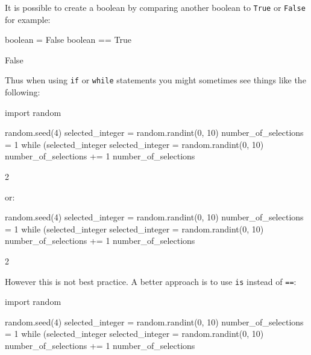 It is possible to create a boolean by comparing another boolean to \texttt{True} or
\texttt{False} for example:




\begin{pyin}
boolean = False
boolean == True
\end{pyin}





\begin{raw}
False
\end{raw}





Thus when using \texttt{if} or \texttt{while} statements you might sometimes see things like
the following:


\begin{pyin}
import random

random.seed(4)
selected_integer = random.randint(0, 10)
number_of_selections = 1
while (selected_integer %
    selected_integer = random.randint(0, 10)
    number_of_selections += 1
number_of_selections
\end{pyin}





\begin{raw}
2
\end{raw}





or:




\begin{pyin}
random.seed(4)
selected_integer = random.randint(0, 10)
number_of_selections = 1
while (selected_integer %
    selected_integer = random.randint(0, 10)
    number_of_selections += 1
number_of_selections
\end{pyin}





\begin{raw}
2
\end{raw}





However this is not best practice. A better approach is to use \texttt{is} instead of
\texttt{==}:




\begin{pyin}
import random

random.seed(4)
selected_integer = random.randint(0, 10)
number_of_selections = 1
while (selected_integer %
    selected_integer = random.randint(0, 10)
    number_of_selections += 1
number_of_selections
\end{pyin}






